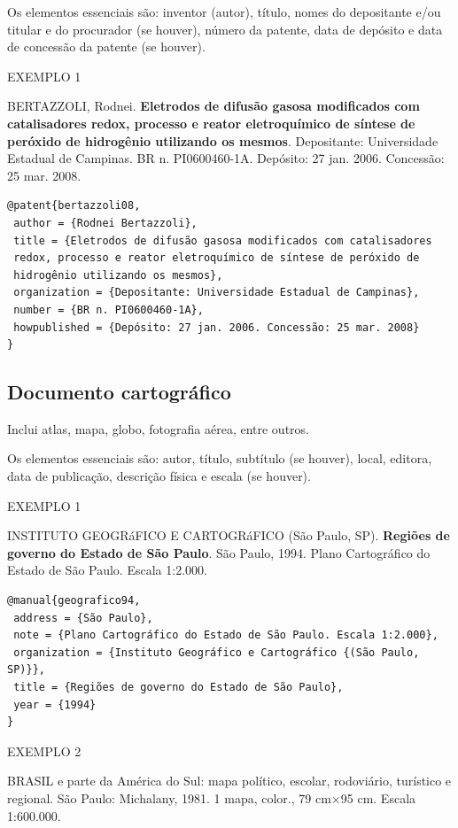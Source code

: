 Os elementos essenciais são: inventor (autor), título, nomes do depositante e/ou titular e do procurador (se houver), número da patente, data de depósito e data de concessão da patente (se houver).

EXEMPLO 1 

BERTAZZOLI, Rodnei. \textbf{Eletrodos de difusão gasosa modificados com catalisadores redox, processo e reator eletroquímico de síntese de peróxido de hidrogênio utilizando os mesmos}. Depositante: Universidade Estadual de Campinas. BR n. PI0600460-1A. Depósito: 27 jan. 2006. Concessão: 25 mar. 2008. 

\begin{verbatim}
@patent{bertazzoli08,
 author = {Rodnei Bertazzoli},
 title = {Eletrodos de difusão gasosa modificados com catalisadores 
 redox, processo e reator eletroquímico de síntese de peróxido de 
 hidrogênio utilizando os mesmos},
 organization = {Depositante: Universidade Estadual de Campinas},
 number = {BR n. PI0600460-1A},
 howpublished = {Depósito: 27 jan. 2006. Concessão: 25 mar. 2008}
}
\end{verbatim}

\subsection{Documento cartográfico}

Inclui atlas, mapa, globo, fotografia aérea, entre outros.

Os elementos essenciais são: autor, título, subtítulo (se houver), local, editora, data de publicação, descrição física e escala (se houver). 

EXEMPLO 1 

INSTITUTO GEOGRáFICO E CARTOGRáFICO (São Paulo, SP). \textbf{Regiões de governo do Estado de São Paulo}. São Paulo, 1994. Plano Cartográfico do Estado de São Paulo. Escala 1:2.000.

\begin{verbatim}
@manual{geografico94,
 address = {São Paulo},
 note = {Plano Cartográfico do Estado de São Paulo. Escala 1:2.000},
 organization = {Instituto Geográfico e Cartográfico {(São Paulo, SP)}},
 title = {Regiões de governo do Estado de São Paulo},
 year = {1994}
}
\end{verbatim}

EXEMPLO 2

BRASIL e parte da América do Sul: mapa político, escolar, rodoviário, turístico e regional. São Paulo: Michalany, 1981. 1 mapa, color., 79 cm$\times$95 cm. Escala 1:600.000.

